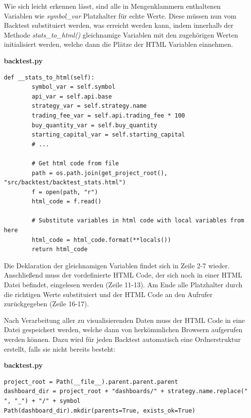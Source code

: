 \documentclass[oneside]{ausarbeitung}
\begin{document}
Wie sich leicht erkennen lässt, sind alle in Mengenklammern enthaltenen Variablen wie \textit{symbol\_var} Platzhalter für echte Werte. Diese müssen nun vom Backtest substituiert werden, was erreicht werden kann, indem innerhalb der Methode \textit{stats\_to\_html()} gleichnamige Variablen mit den zugehörigen Werten initialisiert werden, welche dann die Plätze der HTML Variablen einnehmen.

\lstset{language=Python}
\lstset{frame=lines}
\lstset{basicstyle=\footnotesize}
\textbf{backtest.py}
\begin{lstlisting}
def __stats_to_html(self):
        symbol_var = self.symbol
        api_var = self.api.base
        strategy_var = self.strategy.name
        trading_fee_var = self.api.trading_fee * 100
        buy_quantity_var = self.buy_quantity
        starting_capital_var = self.starting_capital
        # ...

        # Get html code from file
        path = os.path.join(get_project_root(), "src/backtest/backtest_stats.html")
        f = open(path, "r")
        html_code = f.read()

        # Substitute variables in html code with local variables from here
        html_code = html_code.format(**locals())
        return html_code
\end{lstlisting}

Die Deklaration der gleichnamigen Variablen findet sich in Zeile 2-7 wieder. Anschließend muss der vordefinierte HTML Code, der sich noch in einer HTML Datei befindet, eingelesen werden (Zeile 11-13). Am Ende alle Platzhalter durch die richtigen Werte substituiert und der HTML Code an den Aufrufer zurückgegeben (Zeile 16-17).

Nach Verarbeitung aller zu visualisierenden Daten muss der HTML Code in eine Datei gespeichert werden, welche dann von herkömmlichen Browsern aufgerufen werden können. Dazu wird für jeden Backtest automatisch eine Ordnerstruktur erstellt, falls sie nicht bereits besteht:

\lstset{language=Python}
\lstset{frame=lines}
\lstset{basicstyle=\footnotesize}
\textbf{backtest.py}
\begin{lstlisting}
project_root = Path(__file__).parent.parent.parent
dashboard_dir = project_root + "dashboards/" + strategy.name.replace(" ", "_") + "/" + symbol
Path(dashboard_dir).mkdir(parents=True, exists_ok=True)
\end{lstlisting}
\end{document}

